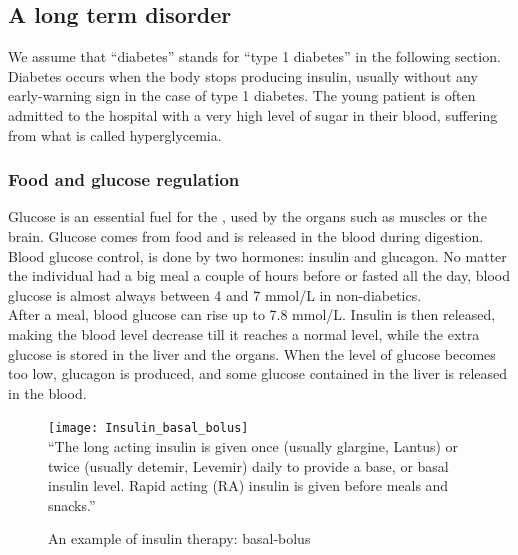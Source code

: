 \subsection{A long term disorder}%
We assume that ``diabetes'' stands for ``type 1 diabetes'' in the following section. Diabetes occurs when the body stops producing insulin, usually without any early-warning sign in the case of type 1 diabetes. The young patient is often admitted to the hospital with a very high level of sugar in their blood, suffering from what is called hyperglycemia.

\subsubsection{Food and glucose regulation}
Glucose is an essential fuel for the , used by the organs such as muscles or the brain. Glucose comes from food and is released in the blood during digestion. Blood glucose control, is done by two hormones: insulin and glucagon. No matter the individual had a big meal a couple of hours before or fasted all the day, blood glucose is almost always between 4 and 7 mmol/L in non-diabetics. 
\\After a meal, blood glucose can rise up to 7.8 mmol/L. Insulin is then released, making the blood level decrease till it reaches a normal level, while the extra glucose is stored in the liver and the organs. When the level of glucose becomes too low, glucagon is produced, and some glucose contained in the liver is released in the blood.

\begin{figure}[h]
  \centering
  \caption{An example of insulin therapy: basal-bolus~\cite{bolusimage}}
  \texttt{[image: Insulin\_basal\_bolus]}\\
  ``The long acting insulin is given once (usually glargine, Lantus) or twice (usually detemir, Levemir) daily to provide a base, or basal insulin level. Rapid acting (RA) insulin is given before meals and snacks.''~\cite{bolusimage}
  \label{fig:Insulin_basal_bolus}
\end{figure}

